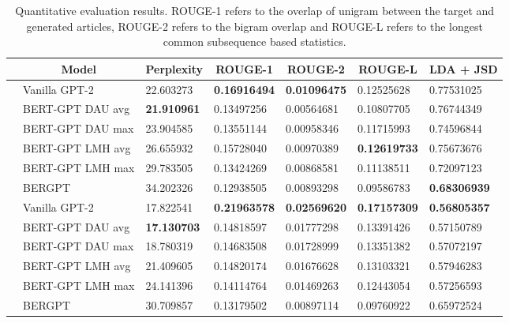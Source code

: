 \documentclass{article}
\begin{document}
\begin{table}[h]
    \centering
    \begin{tabular}{ |p{.2cm}|p{3.5cm}||p{1.6cm}|p{1.6cm}|p{1.6cm}|p{1.6cm}|p{1.6cm}| }
     \hline
     & \multicolumn{1}{c|}{Model} & \multicolumn{1}{c|}{Perplexity} & \multicolumn{1}{c|}{ROUGE-1} & \multicolumn{1}{c|}{ROUGE-2} & \multicolumn{1}{c|}{ROUGE-L} & \multicolumn{1}{c|}{LDA + JSD} \\
     \hline
     \parbox[t]{2mm}{} & Vanilla GPT-2 & 22.603273 &  \textbf{0.16916494} & \textbf{0.01096475}& 0.12525628&  0.77531025 \\
     & BERT-GPT DAU avg & \textbf{21.910961} &  0.13497256& 0.00564681& 0.10807705  &  0.76744349 \\
     & BERT-GPT DAU max & 23.904585 &  0.13551144 & 0.00958346 & 0.11715993 &  0.74596844 \\
     & BERT-GPT LMH avg & 26.655932 & 0.15728040 & 0.00970389 &  \textbf{0.12619733}  &  0.75673676 \\
     & BERT-GPT LMH max & 29.783505 &  0.13424269 & 0.00868581 & 0.11138511   & 0.72097123  \\
     & BERGPT& 34.202326&  0.12938505 & 0.00893298 & 0.09586783   &  \textbf{0.68306939} \\
     \hline
     \parbox[t]{2mm}{} & Vanilla GPT-2 & 17.822541 & \textbf{0.21963578}& \textbf{0.02569620}&  \textbf{0.17157309}   &  \textbf{0.56805357} \\
     & BERT-GPT DAU avg & \textbf{17.130703} & 0.14818597& 0.01777298& 0.13391426 &  0.57150789 \\
     & BERT-GPT DAU max & 18.780319 &  0.14683508& 0.01728999 & 0.13351382  &   0.57072197\\
     & BERT-GPT LMH avg & 21.409605 & 0.14820174 & 0.01676628 &  0.13103321 &  0.57946283 \\
     & BERT-GPT LMH max & 24.141396 &  0.14114764 &  0.01469263 & 0.12443054    &  0.57256593 \\
     & BERGPT& 30.709857&  0.13179502 & 0.00897114 & 0.09760922    & 0.65972524  \\
     \hline
    \end{tabular}
    
    \caption{Quantitative evaluation results. ROUGE-1 refers to the overlap of unigram between the target and generated articles, ROUGE-2 refers to the bigram overlap and ROUGE-L refers to the longest common subsequence based statistics.}
    \label{tab:my_label}
\end{table}
\end{document}
